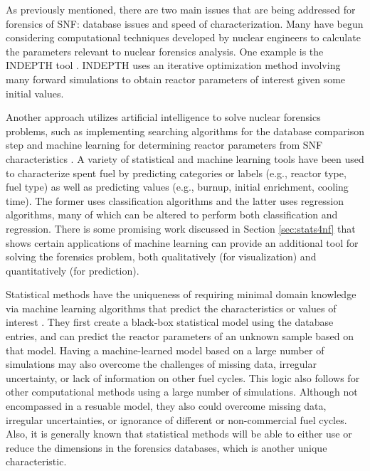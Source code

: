 As previously mentioned, there are two main issues that are being addressed for
forensics of \gls{SNF}: database issues and speed of characterization.  Many
have begun considering computational techniques developed by nuclear engineers
to calculate the parameters relevant to nuclear forensics analysis.  One
example is the \gls{INDEPTH} tool \cite{weber_2006, weber_2010, weber_2011}.
\gls{INDEPTH} uses an iterative optimization method involving many forward
simulations to obtain reactor parameters of interest given some initial values. 

Another approach utilizes artificial intelligence to solve nuclear forensics
problems, such as implementing searching algorithms for the database comparison
step \cite{gey_search} and machine learning for determining reactor parameters
from \gls{SNF} characteristics \cite{dayman_feasibility_2013, nicolaou_2006,
nicolaou_2009, nicolaou_2014, robel_2009, jones_viz_2014, jones_snf_2014}.  A
variety of statistical and machine learning tools have been used to
characterize spent fuel by predicting categories or labels (e.g., reactor type,
fuel type) as well as predicting values (e.g., burnup, initial enrichment,
cooling time). The former uses classification algorithms and the latter uses
regression algorithms, many of which can be altered to perform both
classification and regression.  There is some promising work discussed in
Section \ref{sec:stats4nf} that shows certain applications of machine learning
can provide an additional tool for solving the forensics problem, both
qualitatively (for visualization) and quantitatively (for prediction).

Statistical methods have the uniqueness of requiring minimal domain knowledge
via machine learning algorithms that predict the characteristics or values of
interest \cite{dayman_feasibility_2013, robel_2009, nicolaou_2006,
nicolaou_2009, nicolaou_2014, jones_snf_2014, jones_viz_2014}. They first
create a black-box statistical model using the database entries, and can
predict the reactor parameters of an unknown sample based on that model.
Having a machine-learned model based on a large number of simulations may also
overcome the challenges of missing data, irregular uncertainty, or lack of
information on other fuel cycles.  This logic also follows for other
computational methods using a large number of simulations.  Although not
encompassed in a resuable model, they also could overcome missing data,
irregular uncertainties, or ignorance of different or non-commercial fuel
cycles.  Also, it is generally known that statistical methods will be able to
either use or reduce the dimensions in the forensics databases, which is
another unique characteristic.

